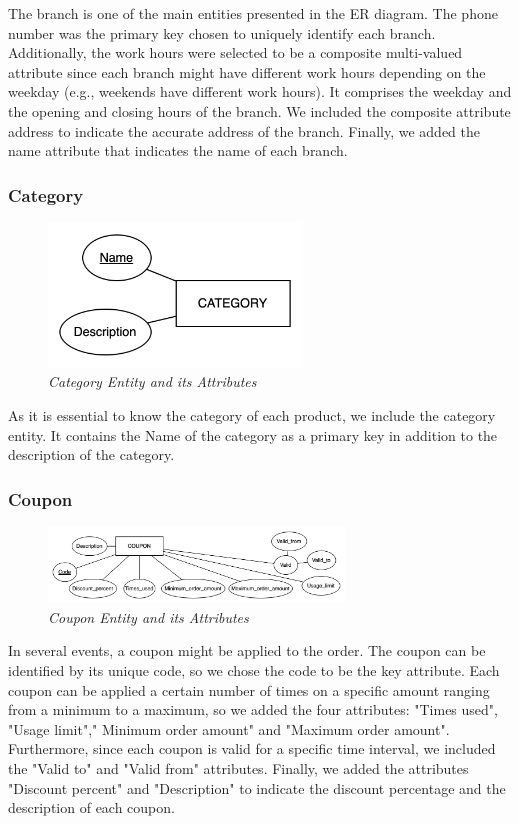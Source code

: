 The branch is one of the main entities presented in the ER diagram. The phone number was the primary key chosen to uniquely identify each branch. Additionally, the work hours were selected to be a composite multi-valued attribute since each branch might have different work hours depending on the weekday (e.g., weekends have different work hours). It comprises the weekday and the opening and closing hours of the branch. We included the composite attribute address to indicate the accurate address of the branch. Finally, we added the name attribute that indicates the name of each branch.

\subsubsection{Category}
\begin{figure}[H]
  \centering
  \includegraphics[width=0.6\textwidth]{images/entities/category.png}
  \caption{\textit{Category Entity and its Attributes}}
\end{figure}

As it is essential to know the category of each product, we include the category entity. It contains the Name of the category as a primary key in addition to the description of the category.

\subsubsection{Coupon}
\begin{figure}[H]
  \centering
  \includegraphics[width=0.7\textwidth]{images/entities/coupon.png}
  \caption{\textit{Coupon Entity and its Attributes}}
\end{figure}

In several events, a coupon might be applied to the order. The coupon can be identified by its unique code, so we chose the code to be the key attribute. Each coupon can be applied a certain number of times on a specific amount ranging from a minimum to a maximum, so we added the four attributes: "Times used", "Usage limit"," Minimum order amount" and "Maximum order amount". Furthermore, since each coupon is valid for a specific time interval, we included the "Valid to" and "Valid from" attributes. Finally, we added the attributes "Discount percent" and "Description" to indicate the discount percentage and the description of each coupon.

